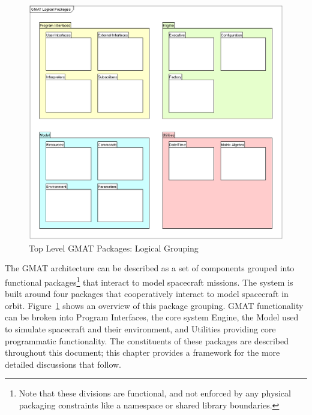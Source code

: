 \begin{figure}
\begin{center}
\includegraphics[scale=0.5]{Images/GMATLogicalPackages.eps}
\caption{\label{figure:TopLevelPackages}Top Level GMAT Packages: Logical Grouping}
\end{center}
\end{figure}


The GMAT architecture can be described as a set of components grouped into functional
packages\footnote{Note that these divisions are functional, and not enforced by any physical
packaging constraints like a namespace or shared library boundaries.} that interact to model
spacecraft missions.  The system is built around four packages that cooperatively interact to
model spacecraft in orbit. Figure~\ref{figure:TopLevelPackages} shows an overview of this package
grouping.  GMAT functionality can be broken into Program Interfaces, the core system Engine, the
Model used to simulate spacecraft and their environment, and Utilities providing core programmatic
functionality. The constituents of these packages are described throughout this document; this
chapter provides a framework for the more detailed discussions that follow.

